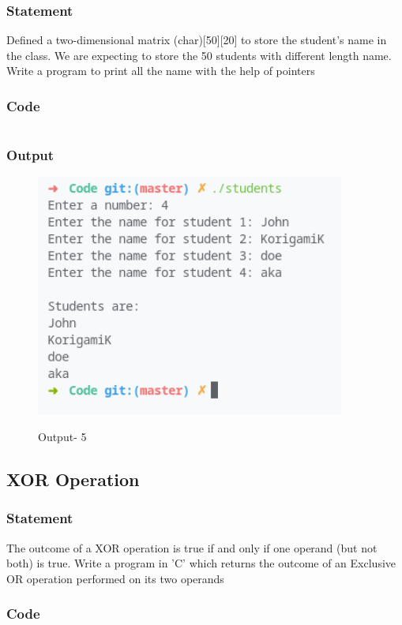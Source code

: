 \subsubsection{Statement}
Defined a two-dimensional matrix (char)[50][20] to store the student’s name in the class.
We are expecting to store the 50 students with different length name. Write a program to print all
the name with the help of pointers

\subsubsection{Code}
\inputminted[]{c}{../Code/students.cpp}
\subsubsection{Output}
\begin{figure}[!htb]
  \centering
  \includegraphics[width=4in]{Images/student_names.png}
  \label{Output-5}
  \caption{Output- 5}
\end{figure}

\pagebreak
\subsection{XOR Operation}

\subsubsection{Statement}
The outcome of a XOR operation is true if and only if one operand (but not both) is true. Write
a program in 'C' which returns the outcome of an Exclusive OR operation performed on its two
operands

\subsubsection{Code}
\inputminted[]{c}{../Code/xor.cpp}
